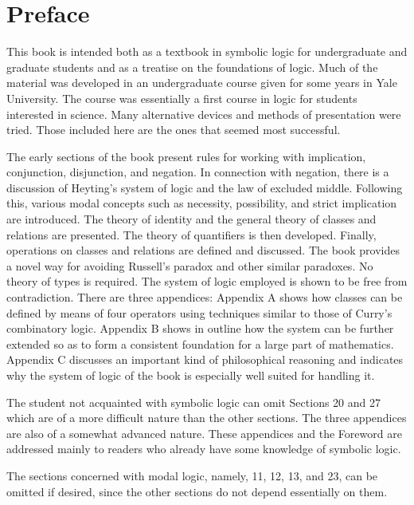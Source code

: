 \documentclass{book}
\begin{document}
\chapter*{\vspace*{3ex}Preface}

This book is intended both as a textbook in symbolic logic for undergraduate and graduate students and as a treatise on the foundations of logic.  Much of the material was developed in an undergraduate course given for some years in Yale University.  The course was essentially a first course in logic for students interested in science.  Many alternative devices and methods of presentation were tried.  Those included here are the ones that seemed most successful.

The early sections of the book present rules for working with implication, conjunction, disjunction, and negation.  In connection with negation, there is a discussion of Heyting's system of logic and the law of excluded middle.  Following this, various modal concepts such as necessity, possibility, and strict implication are introduced.  The theory of identity and the general theory of classes and relations are presented.  The theory of quantifiers is then developed.  Finally, operations on classes and relations are defined and discussed.  The book provides a novel way for avoiding Russell's paradox and other similar paradoxes.  No theory of types is required.  The system of logic employed is shown to be free from contradiction.  There are three appendices: Appendix A shows how classes can be defined by means of four operators using techniques similar to those of Curry's combinatory logic.  Appendix B shows in outline how the system can be further extended so as to form a consistent foundation for a large part of mathematics.  Appendix C discusses an important kind of philosophical reasoning and indicates why the system of logic of the book is especially well suited for handling it.

The student not acquainted with symbolic logic can omit Sections 20 and 27 which are of a more difficult nature than the other sections.  The three appendices are also of a somewhat advanced nature.  These appendices and the Foreword are addressed mainly to readers who already have some knowledge of symbolic logic.

The sections concerned with modal logic, namely, 11, 12, 13, and 23, can be omitted if desired, since the other sections do not depend essentially on them.
\end{document}
